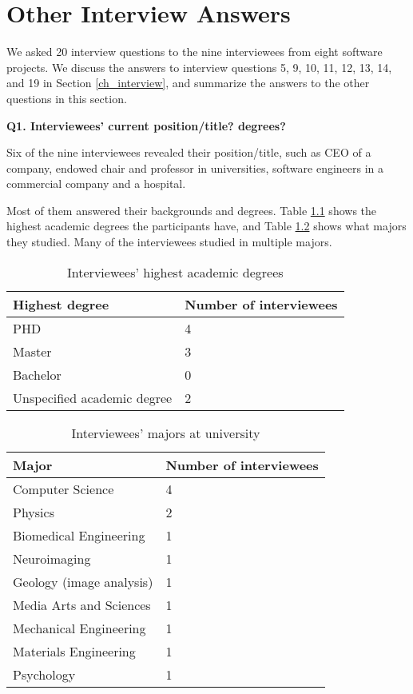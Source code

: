 \chapter{Other Interview Answers}
\label{ap_interview}

We asked 20 interview questions to the nine interviewees from eight software projects. We discuss the answers to interview questions 5, 9, 10, 11, 12, 13, 14, and 19 in Section \ref{ch_interview}, and summarize the answers to the other questions in this section.

\noindent\textbf{Q1. Interviewees’ current position/title? degrees?}

Six of the nine interviewees revealed their position/title, such as CEO of a company, endowed chair and professor in universities, software engineers in a commercial company and a hospital.

Most of them answered their backgrounds and degrees. Table \ref{tab_q1_degrees} shows the highest academic degrees the participants have, and Table \ref{tab_q1_majors} shows what majors they studied. Many of the interviewees studied in multiple majors.

\begin{table}[H]
\centering
\begin{tabular}{ll}
\hline
Highest degree & Number of interviewees \\ \hline
PHD & 4 \\
Master & 3 \\
Bachelor & 0 \\
Unspecified academic degree & 2 \\ \hline
\end{tabular}
\caption{\label{tab_q1_degrees}Interviewees' highest academic degrees}
\end{table}

\begin{table}[H]
\centering
\begin{tabular}{ll}
\hline
Major & Number of interviewees \\ \hline
Computer Science & 4 \\
Physics & 2 \\
Biomedical Engineering & 1 \\
Neuroimaging & 1 \\
Geology (image analysis) & 1 \\
Media Arts and Sciences & 1 \\
Mechanical Engineering & 1 \\
Materials Engineering & 1 \\
Psychology & 1 \\ \hline
\end{tabular}
\caption{\label{tab_q1_majors}Interviewees' majors at university}
\end{table}

